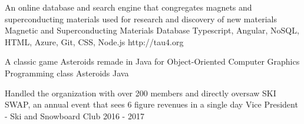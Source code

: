 \documentclass[]{awesome-cv}
\begin{document}
\vspace{-1mm}
\begin{cventries}
	\cventry
	{An online database and search engine that congregates magnets and superconducting materials used for research and discovery of new materials}
	{Magnetic and Superconducting Materials Database}
	{Typescript, Angular, NoSQL, HTML, Azure, Git, CSS, Node.js}
	{http://tau4.org}
	{}
	
	
	\cventry
	{A classic game Asteroids remade in Java for Object-Oriented Computer Graphics Programming class}
	{Asteroids}
	{Java}
	{}
	{}
	
	\vspace{-1mm}
\end{cventries}
\begin{cventries}
\cventry
    {Handled the organization with over 200 members and directly oversaw SKI SWAP, an annual event that sees 6 figure revenues in a single day}
    {Vice President - Ski and Snowboard Club}
    {}
    {2016 - 2017}
    {}
\end{cventries}
\ 
\end{document}
